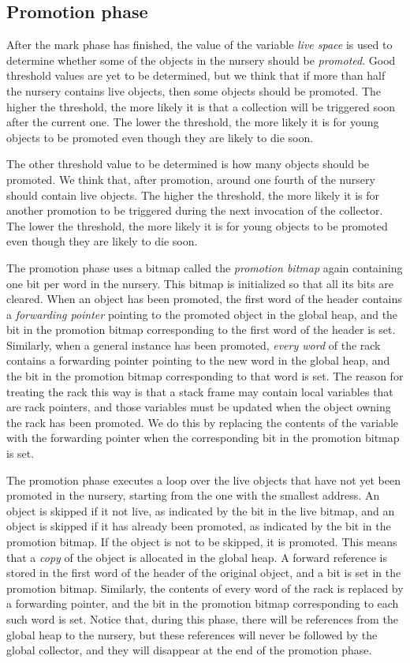 \subsection{Promotion phase}

After the mark phase has finished, the value of the variable
\emph{live space} is used to determine whether some of the
objects in the nursery should be \emph{promoted}.  Good threshold
values are yet to be determined, but we think that if more than half
the nursery contains live objects, then some objects should be
promoted.  The higher the threshold, the more likely it is that a
collection will be triggered soon after the current one.  The lower
the threshold, the more likely it is for young objects to be promoted
even though they are likely to die soon.

The other threshold value to be determined is how many objects should
be promoted.  We think that, after promotion, around one fourth of the
nursery should contain live objects.  The higher the threshold, the
more likely it is for another promotion to be triggered during the
next invocation of the collector.  The lower the threshold, the more
likely it is for young objects to be promoted even though they are
likely to die soon.

The promotion phase uses a bitmap called the \emph{promotion bitmap}
again containing one bit per word in the nursery.  This bitmap is
initialized so that all its bits are cleared.  When an object has been
promoted, the first word of the header contains a \emph{forwarding
  pointer} pointing to the promoted object in the global heap, and the
bit in the promotion bitmap corresponding to the first word of the
header is set.  Similarly, when a general instance has been promoted,
\emph{every word} of the rack contains a forwarding pointer pointing
to the new word in the global heap, and the bit in the promotion
bitmap corresponding to that word is set.  The reason for treating the
rack this way is that a stack frame may contain local variables that
are rack pointers, and those variables must be updated when the object
owning the rack has been promoted.  We do this by replacing the
contents of the variable with the forwarding pointer when the
corresponding bit in the promotion bitmap is set.

The promotion phase executes a loop over the live objects that have
not yet been promoted in the nursery, starting from the one with the
smallest address.  An object is skipped if it not live, as indicated
by the bit in the live bitmap, and an object is skipped if it has
already been promoted, as indicated by the bit in the promotion
bitmap.  If the object is not to be skipped, it is promoted.  This
means that a \emph{copy} of the object is allocated in the global
heap.  A forward reference is stored in the first word of the header
of the original object, and a bit is set in the promotion bitmap.
Similarly, the contents of every word of the rack is replaced by a
forwarding pointer, and the bit in the promotion bitmap corresponding
to each such word is set.  Notice that, during this phase, there will
be references from the global heap to the nursery, but these
references will never be followed by the global collector, and they
will disappear at the end of the promotion phase.

